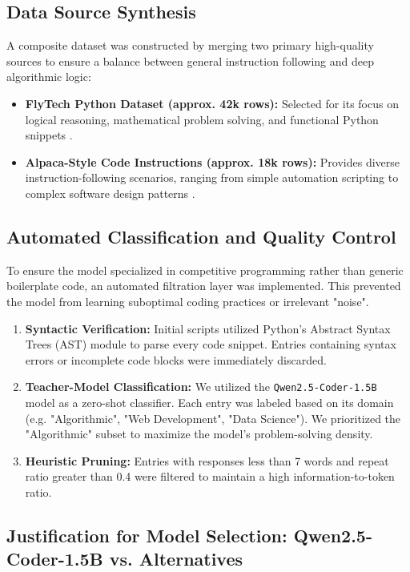\subsection{Data Source Synthesis}
A composite dataset was constructed by merging two primary high-quality sources to ensure a balance between general instruction following and deep algorithmic logic:
\begin{itemize}
    \item \textbf{FlyTech Python Dataset (approx. 42k rows):} Selected for its focus on logical reasoning, mathematical problem solving, and functional Python snippets \cite{FlyTechDataset2026}.
    \item \textbf{Alpaca-Style Code Instructions (approx. 18k rows):} Provides diverse instruction-following scenarios, ranging from simple automation scripting to complex software design patterns \cite{AlpacaPythonInstructions2026}.
\end{itemize}



\subsection{Automated Classification and Quality Control}
To ensure the model specialized in competitive programming rather than generic boilerplate code, an automated filtration layer was implemented. This prevented the model from learning suboptimal coding practices or irrelevant "noise".

\begin{enumerate}
    \item \textbf{Syntactic Verification:} Initial scripts utilized Python's Abstract Syntax Trees (AST) module to parse every code snippet. Entries containing syntax errors or incomplete code blocks were immediately discarded.
    \item \textbf{Teacher-Model Classification:} We utilized the \texttt{Qwen2.5-Coder-1.5B} model as a zero-shot classifier. Each entry was labeled based on its domain (e.g. "Algorithmic", "Web Development", "Data Science"). We prioritized the "Algorithmic" subset to maximize the model's problem-solving density.
    \item \textbf{Heuristic Pruning:} Entries with responses less than 7 words and repeat ratio greater than 0.4 were filtered to maintain a high information-to-token ratio.
\end{enumerate}


\subsection{Justification for Model Selection: Qwen2.5-Coder-1.5B vs. Alternatives}

